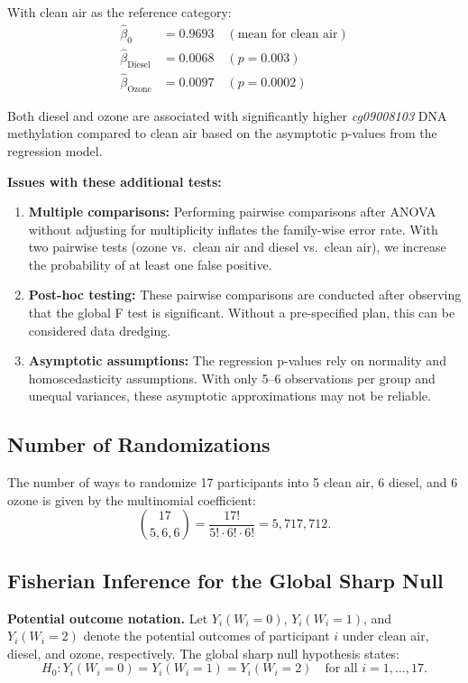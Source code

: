 \documentclass[11pt]{article}
\begin{document}
With clean air as the reference category:
\begin{align*}
  \hat{\beta}_0 &= 0.9693 \quad (\text{mean for clean air}) \\
  \hat{\beta}_{\text{Diesel}} &= 0.0068 \quad (p = 0.003) \\
  \hat{\beta}_{\text{Ozone}} &= 0.0097 \quad (p = 0.0002)
\end{align*}

Both diesel and ozone are associated with significantly higher \textit{cg09008103} DNA methylation compared to clean air based on the asymptotic p-values from the regression model.

\textbf{Issues with these additional tests:}
\begin{enumerate}
  \item \textbf{Multiple comparisons:} Performing pairwise comparisons after ANOVA without adjusting for multiplicity inflates the family-wise error rate. With two pairwise tests (ozone vs.\ clean air and diesel vs.\ clean air), we increase the probability of at least one false positive.
  \item \textbf{Post-hoc testing:} These pairwise comparisons are conducted after observing that the global F test is significant. Without a pre-specified plan, this can be considered data dredging.
  \item \textbf{Asymptotic assumptions:} The regression p-values rely on normality and homoscedasticity assumptions. With only 5--6 observations per group and unequal variances, these asymptotic approximations may not be reliable.
\end{enumerate}

\subsection*{Number of Randomizations}

The number of ways to randomize 17 participants into 5 clean air, 6 diesel, and 6 ozone is given by the multinomial coefficient:
\[
  \binom{17}{5, 6, 6} = \frac{17!}{5! \cdot 6! \cdot 6!} = 5{,}717{,}712.
\]

\subsection*{Fisherian Inference for the Global Sharp Null}

\textbf{Potential outcome notation.} Let $Y_i(W_i = 0)$, $Y_i(W_i = 1)$, and $Y_i(W_i = 2)$ denote the potential outcomes of participant $i$ under clean air, diesel, and ozone, respectively. The global sharp null hypothesis states:
\[
  H_0: Y_i(W_i = 0) = Y_i(W_i = 1) = Y_i(W_i = 2) \quad \text{for all } i = 1, \ldots, 17.
\]
\end{document}
